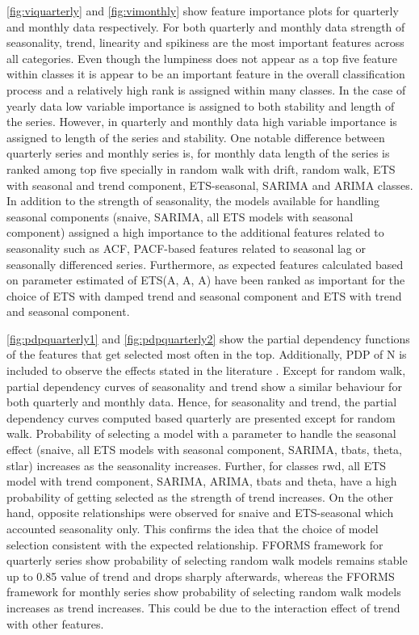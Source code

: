 \documentclass[11pt,a4paper,]{article}
\begin{document}
\autoref{fig:viquarterly} and \autoref{fig:vimonthly} show feature
importance plots for quarterly and monthly data respectively. For both
quarterly and monthly data strength of seasonality, trend, linearity and
spikiness are the most important features across all categories. Even
though the lumpiness does not appear as a top five feature within
classes it is appear to be an important feature in the overall
classification process and a relatively high rank is assigned within
many classes. In the case of yearly data low variable importance is
assigned to both stability and length of the series. However, in
quarterly and monthly data high variable importance is assigned to
length of the series and stability. One notable difference between
quarterly series and monthly series is, for monthly data length of the
series is ranked among top five specially in random walk with drift,
random walk, ETS with seasonal and trend component, ETS-seasonal, SARIMA
and ARIMA classes. In addition to the strength of seasonality, the
models available for handling seasonal components (snaive, SARIMA, all
ETS models with seasonal component) assigned a high importance to the
additional features related to seasonality such as ACF, PACF-based
features related to seasonal lag or seasonally differenced series.
Furthermore, as expected features calculated based on parameter
estimated of ETS(A, A, A) have been ranked as important for the choice
of ETS with damped trend and seasonal component and ETS with trend and
seasonal component.

\autoref{fig:pdpquarterly1} and \autoref{fig:pdpquarterly2} show the
partial dependency functions of the features that get selected most
often in the top. Additionally, PDP of N is included to observe the
effects stated in the literature \autocite{makridakis2000m3}. Except for
random walk, partial dependency curves of seasonality and trend show a
similar behaviour for both quarterly and monthly data. Hence, for
seasonality and trend, the partial dependency curves computed based
quarterly are presented except for random walk. Probability of selecting
a model with a parameter to handle the seasonal effect (snaive, all ETS
models with seasonal component, SARIMA, tbats, theta, stlar) increases
as the seasonality increases. Further, for classes rwd, all ETS model
with trend component, SARIMA, ARIMA, tbats and theta, have a high
probability of getting selected as the strength of trend increases. On
the other hand, opposite relationships were observed for snaive and
ETS-seasonal which accounted seasonality only. This confirms the idea
that the choice of model selection consistent with the expected
relationship. FFORMS framework for quarterly series show probability of
selecting random walk models remains stable up to 0.85 value of trend
and drops sharply afterwards, whereas the FFORMS framework for monthly
series show probability of selecting random walk models increases as
trend increases. This could be due to the interaction effect of trend
with other features.
\end{document}
